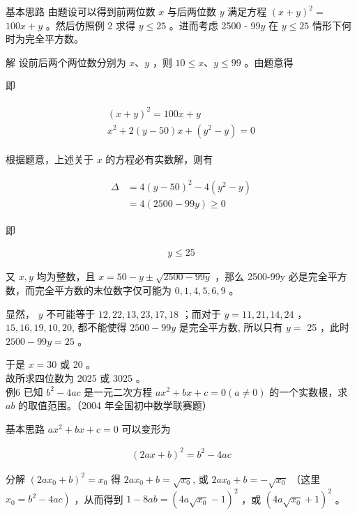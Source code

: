\documentclass[10pt]{article}
\begin{document}
基本思路 由题设可以得到前两位数 $x$ 与后两位数 $y$ 满足方程 $(x+y)^{2}=$ $100 x+y$ 。然后仿照例 2 求得 $y \leqslant 25$ 。进而考虑 2500 - $99 y$ 在 $y \leqslant 25$ 情形下何时为完全平方数。

解 设前后两个两位数分别为 $x 、 y$ ，则 $10 \leqslant x 、 y \leqslant 99$ 。由题意得

即

\begin{align*}
\begin{gathered}
(x+y)^{2}=100 x+y \\
x^{2}+2(y-50) x+\left(y^{2}-y\right)=0
\end{gathered}
\end{align*}

根据题意，上述关于 $x$ 的方程必有实数解，则有

\begin{align*}
\begin{aligned}
\Delta & =4(y-50)^{2}-4\left(y^{2}-y\right) \\
& =4(2500-99 y) \geqslant 0
\end{aligned}
\end{align*}

即

\begin{align*}
y \leqslant 25
\end{align*}

又 $x, y$ 均为整数，且 $x=50-y \pm \sqrt{2500-99 y}$ ，那么 2500-99y 必是完全平方数，而完全平方数的末位数字仅可能为 $0,1,4,5,6,9$ 。

显然， $y$ 不可能等于 $12,22,13,23,17,18$ ；而对于 $y=11,21,14,24$ ，\\
$15,16,19,10,20$, 都不能使得 $2500-99 y$ 是完全平方数, 所以只有 $y=$ 25 ，此时 $2500-99 y=25$ 。

于是 $x=30$ 或 20 。\\
故所求四位数为 2025 或 3025 。\\
例6 已知 $b^{2}-4 a c$ 是一元二次方程 $a x^{2}+b x+c=0(a \neq 0)$ 的一个实数根，求 $a b$ 的取值范围。（2004 年全国初中数学联赛题）

基本思路 $a x^{2}+b x+c=0$ 可以变形为

\begin{align*}
(2 a x+b)^{2}=b^{2}-4 a c
\end{align*}

分解 $\left(2 a x_{0}+b\right)^{2}=x_{0}$ 得 $2 a x_{0}+b=\sqrt{x_{0}}$, 或 $2 a x_{0}+b=-\sqrt{x_{0}}$ （这里 $\left.x_{0}=b^{2}-4 a c\right)$ ，从而得到 $1-8 a b=\left(4 a \sqrt{x_{0}}-1\right)^{2}$ ，或 $\left(4 a \sqrt{x_{0}}+1\right)^{2}$ 。
\end{document}
